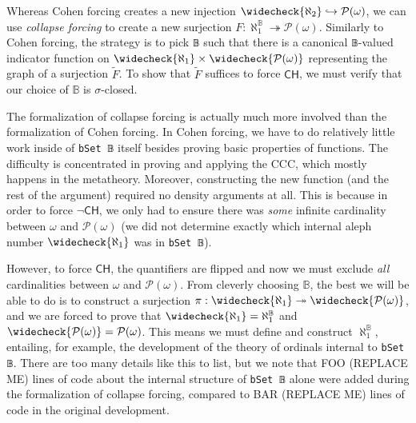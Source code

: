 \documentclass[sigplan,10pt,review, anonymous]{acmart}
\newcommand{\lil}{\lstinline}
\newcommand{\CH}{\mathsf{CH}}
\theoremstyle{definition}
\begin{document}
Whereas Cohen forcing creates a new injection \(\widecheck{\aleph_2} \hookrightarrow \mathcal{P}(\omega)\), we can use \emph{collapse forcing} to create a new surjection \(F : \aleph_1^{\mathbb{B}} \twoheadrightarrow \mathcal{P}(\omega)\).
Similarly to Cohen forcing, the strategy is to pick \lil{𝔹} such that there is a canonical \lil{𝔹}-valued indicator function on \(\widecheck{\aleph_1} \times \widecheck{\mathcal{P}(\omega)}\) representing the graph of a surjection \(\widetilde{F}\).
To show that \(\widetilde{F}\) suffices to force \(\CH\), we must verify that our choice of \(\mathbb{B}\) is \(\sigma\)-closed.
%

The formalization of collapse forcing is actually much more involved than the formalization of Cohen forcing. In Cohen forcing, we have to do relatively little work inside of \lil{bSet 𝔹} itself besides proving basic properties of functions. The difficulty is concentrated in proving and applying the CCC, which mostly happens in the metatheory. Moreover, constructing the new function (and the rest of the argument) required no density arguments at all. This is because in order to force \(\neg \CH\), we only had to ensure there was \emph{some} infinite cardinality between \(\omega\) and \(\mathcal{P}(\omega)\) (we did not determine exactly which internal aleph number \(\widecheck{\aleph_1}\) was in \lil{bSet 𝔹}).

However, to force \(\CH\), the quantifiers are flipped and now we must exclude \emph{all} cardinalities between \(\omega\) and \(\mathcal{P}(\omega)\). From cleverly choosing \(\mathbb{B}\), the best we will be able to do is to construct a surjection \(\pi : \widecheck{\aleph_1} \twoheadrightarrow \widecheck{\mathcal{P}(\omega)}\), and we are forced to prove that \(\widecheck{\aleph_1} = \aleph_1^{\mathbb{B}}\) and \(\widecheck{\mathcal{P}(\omega)} = \mathcal{P}(\omega)\). This means we must define and construct \(\aleph_1^{\mathbb{B}}\), entailing, for example, the development of the theory of ordinals internal to \lstinline{bSet 𝔹}. There are too many details like this to list, but we note that FOO (REPLACE ME) lines of code about the internal structure of \lstinline{bSet 𝔹} alone were added during the formalization of collapse forcing, compared to BAR (REPLACE ME) lines of code in the original development.

\end{document}
